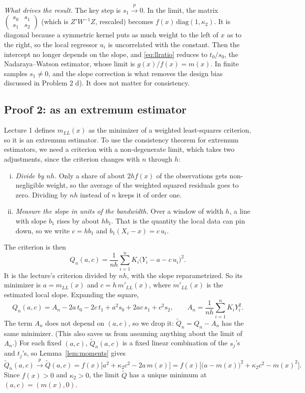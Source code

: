 \documentclass[11pt]{article}
\theoremstyle{plain}
\begin{document}
\emph{What drives the result.} The key step is $s_1\xrightarrow{p}0$. In the limit, the matrix $\begin{pmatrix}s_0&s_1\\ s_1&s_2\end{pmatrix}$ (which is $Z'W^{-1}Z$, rescaled) becomes $f(x)\,\mathrm{diag}(1,\kappa_2)$. It is diagonal because a symmetric kernel puts as much weight to the left of $x$ as to the right, so the local regressor $u_i$ is uncorrelated with the constant. Then the intercept no longer depends on the slope, and \eqref{eq:llratio} reduces to $t_0/s_0$, the Nadaraya--Watson estimator, whose limit is $g(x)/f(x)=m(x)$. In finite samples $s_1\neq 0$, and the slope correction is what removes the design bias discussed in Problem 2 d). It does not matter for consistency.

\subsection*{Proof 2: as an extremum estimator}

Lecture 1 defines $m_{LL}(x)$ as the minimizer of a weighted least-squares criterion, so it is an extremum estimator. To use the consistency theorem for extremum estimators, we need a criterion with a non-degenerate limit, which takes two adjustments, since the criterion changes with $n$ through $h$:
\begin{enumerate}[(i)]
	\item \emph{Divide by $nh$.} Only a share of about $2hf(x)$ of the observations gets non-negligible weight, so the average of the weighted squared residuals goes to zero. Dividing by $nh$ instead of $n$ keeps it of order one.
	\item \emph{Measure the slope in units of the bandwidth.} Over a window of width $h$, a line with slope $b_1$ rises by about $hb_1$. That is the quantity the local data can pin down, so we write $c=hb_1$ and $b_1(X_i-x)=c\,u_i$.
\end{enumerate}
The criterion is then
\[
Q_n(a,c) = \frac1{nh}\sum_{i=1}^nK_i\big(Y_i-a-c\,u_i\big)^2 .
\]
It is the lecture's criterion divided by $nh$, with the slope reparametrized. So its minimizer is $a=m_{LL}(x)$ and $c=h\,m'_{LL}(x)$, where $m'_{LL}(x)$ is the estimated local slope. Expanding the square,
\[
Q_n(a,c) = A_n - 2a\,t_0 - 2c\,t_1 + a^2s_0 + 2ac\,s_1 + c^2s_2,\qquad A_n=\frac1{nh}\sum_{i=1}^nK_iY_i^2 .
\]
The term $A_n$ does not depend on $(a,c)$, so we drop it: $\tilde Q_n=Q_n-A_n$ has the same minimizer. (This also saves us from assuming anything about the limit of $A_n$.) For each fixed $(a,c)$, $\tilde Q_n(a,c)$ is a fixed linear combination of the $s_j$'s and $t_j$'s, so Lemma~\ref{lem:moments} gives
\[
\tilde Q_n(a,c)\xrightarrow{p}\tilde Q(a,c) = f(x)\Big[a^2+\kappa_2c^2-2a\,m(x)\Big] = f(x)\Big[\big(a-m(x)\big)^2+\kappa_2c^2-m(x)^2\Big].
\]
Since $f(x)>0$ and $\kappa_2>0$, the limit $\tilde Q$ has a unique minimum at $(a,c)=(m(x),0)$.
\end{document}
